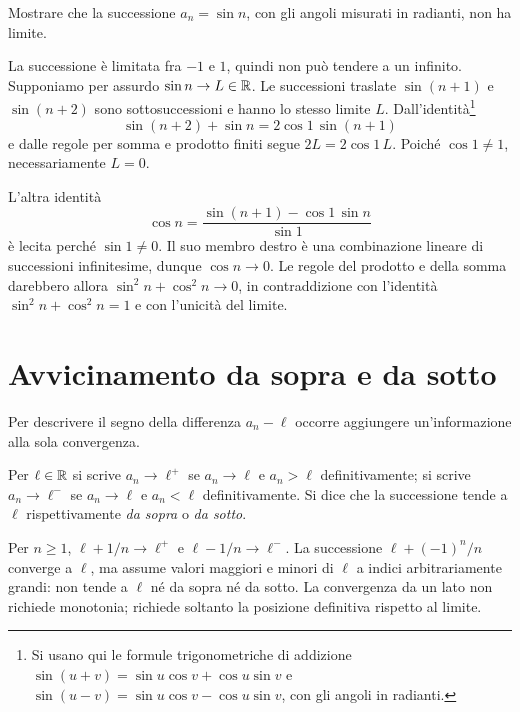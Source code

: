 \begin{esercizio}
Mostrare che la successione $a_n=\sin n$, con gli angoli misurati in radianti, non ha limite.
\end{esercizio}
\begin{svolgimento}
La successione è limitata fra $-1$ e $1$, quindi non può tendere a un infinito. Supponiamo per assurdo $\sin n\to L\in\mathbb{R}$. Le successioni traslate $\sin(n+1)$ e $\sin(n+2)$ sono sottosuccessioni e hanno lo stesso limite $L$. Dall'identità\footnote{Si usano qui le formule trigonometriche di addizione $\sin(u+v)=\sin u\cos v+\cos u\sin v$ e $\sin(u-v)=\sin u\cos v-\cos u\sin v$, con gli angoli in radianti.}
\[
\sin(n+2)+\sin n=2\cos1\,\sin(n+1)
\]
e dalle regole per somma e prodotto finiti segue $2L=2\cos1\,L$. Poiché $\cos1\ne1$, necessariamente $L=0$.

L'altra identità
\[
\cos n=\frac{\sin(n+1)-\cos1\,\sin n}{\sin1}
\]
è lecita perché $\sin1\ne0$. Il suo membro destro è una combinazione lineare di successioni infinitesime, dunque $\cos n\to0$. Le regole del prodotto e della somma darebbero allora $\sin^2n+\cos^2n\to0$, in contraddizione con l'identità $\sin^2n+\cos^2n=1$ e con l'unicità del limite.
\end{svolgimento}

\section{Avvicinamento da sopra e da sotto}
\label{sec:avvicinamento-laterale}

Per descrivere il segno della differenza $a_n-\ell$ occorre aggiungere un'informazione alla sola convergenza.

\begin{definizione}
Per $\ell\in\mathbb{R}$ si scrive $a_n\to\ell^+$ se $a_n\to\ell$ e $a_n>\ell$ definitivamente; si scrive $a_n\to\ell^-$ se $a_n\to\ell$ e $a_n<\ell$ definitivamente. Si dice che la successione tende a $\ell$ rispettivamente \emph{da sopra} o \emph{da sotto}.
\end{definizione}

\begin{esempio}
Per $n\ge1$, $\ell+1/n\to\ell^+$ e $\ell-1/n\to\ell^-$. La successione $\ell+(-1)^n/n$ converge a $\ell$, ma assume valori maggiori e minori di $\ell$ a indici arbitrariamente grandi: non tende a $\ell$ né da sopra né da sotto. La convergenza da un lato non richiede monotonia; richiede soltanto la posizione definitiva rispetto al limite.
\end{esempio}

